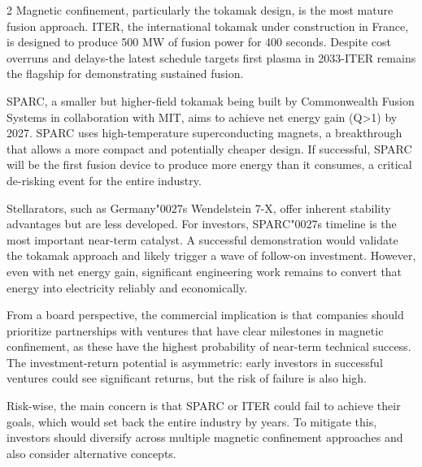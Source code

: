 \documentclass[10pt,a4paper]{article}
\newcommand{\BOApos}{{\BOQuoteFont\char"0027}}
\begin{document}
\begin{multicols}{2}
{\small Magnetic confinement, particularly the tokamak design, is the most mature fusion approach. ITER, the international tokamak under construction in France, is designed to produce 500 MW of fusion power for 400 seconds. Despite cost overruns and delays-the latest schedule targets first plasma in 2033-ITER remains the flagship for demonstrating sustained fusion.}\par
{\small SPARC, a smaller but higher-field tokamak being built by Commonwealth Fusion Systems in collaboration with MIT, aims to achieve net energy gain (Q>1) by 2027. SPARC uses high-temperature superconducting magnets, a breakthrough that allows a more compact and potentially cheaper design. If successful, SPARC will be the first fusion device to produce more energy than it consumes, a critical de-risking event for the entire industry.}\par
{\small Stellarators, such as Germany\BOApos{}s Wendelstein 7-X, offer inherent stability advantages but are less developed. For investors, SPARC\BOApos{}s timeline is the most important near-term catalyst. A successful demonstration would validate the tokamak approach and likely trigger a wave of follow-on investment. However, even with net energy gain, significant engineering work remains to convert that energy into electricity reliably and economically.}\par
{\small From a board perspective, the commercial implication is that companies should prioritize partnerships with ventures that have clear milestones in magnetic confinement, as these have the highest probability of near-term technical success. The investment-return potential is asymmetric: early investors in successful ventures could see significant returns, but the risk of failure is also high.}\par
{\small Risk-wise, the main concern is that SPARC or ITER could fail to achieve their goals, which would set back the entire industry by years. To mitigate this, investors should diversify across multiple magnetic confinement approaches and also consider alternative concepts.}\par
\end{multicols}
\label{chap:2:end}
\end{document}
